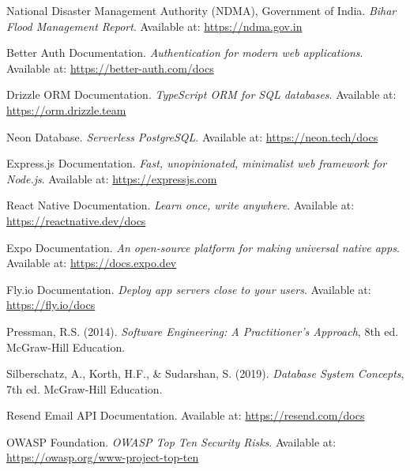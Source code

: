 \documentclass[12pt,a4paper]{article}
\begin{document}
\begin{enumerate}[leftmargin=*, label={[\arabic*]}, itemsep=4pt]

  \item National Disaster Management Authority (NDMA), Government of India.
        \textit{Bihar Flood Management Report}.
        Available at: \url{https://ndma.gov.in}

  \item Better Auth Documentation.
        \textit{Authentication for modern web applications}.
        Available at: \url{https://better-auth.com/docs}

  \item Drizzle ORM Documentation.
        \textit{TypeScript ORM for SQL databases}.
        Available at: \url{https://orm.drizzle.team}

  \item Neon Database.
        \textit{Serverless PostgreSQL}.
        Available at: \url{https://neon.tech/docs}

  \item Express.js Documentation.
        \textit{Fast, unopinionated, minimalist web framework for Node.js}.
        Available at: \url{https://expressjs.com}

  \item React Native Documentation.
        \textit{Learn once, write anywhere}.
        Available at: \url{https://reactnative.dev/docs}

  \item Expo Documentation.
        \textit{An open-source platform for making universal native apps}.
        Available at: \url{https://docs.expo.dev}

  \item Fly.io Documentation.
        \textit{Deploy app servers close to your users}.
        Available at: \url{https://fly.io/docs}

  \item Pressman, R.S. (2014).
        \textit{Software Engineering: A Practitioner's Approach}, 8th ed.
        McGraw-Hill Education.

  \item Silberschatz, A., Korth, H.F., \& Sudarshan, S. (2019).
        \textit{Database System Concepts}, 7th ed.
        McGraw-Hill Education.

  \item Resend Email API Documentation.
        Available at: \url{https://resend.com/docs}

  \item OWASP Foundation.
        \textit{OWASP Top Ten Security Risks}.
        Available at: \url{https://owasp.org/www-project-top-ten}

\end{enumerate}
\end{document}
